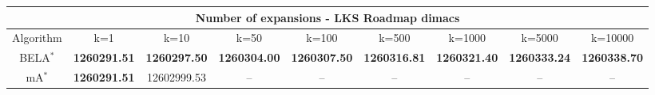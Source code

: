 \begin{tabular}{c|cccccccc}\toprule
\multicolumn{9}{c}{Number of expansions - LKS Roadmap dimacs}\\ \midrule
Algorithm & k=1 & k=10 & k=50 & k=100 & k=500 & k=1000 & k=5000 & k=10000 \\ \midrule
BELA$^*$ & \textbf{1260291.51} & \textbf{1260297.50} & \textbf{1260304.00} & \textbf{1260307.50} & \textbf{1260316.81} & \textbf{1260321.40} & \textbf{1260333.24} & \textbf{1260338.70} \\
mA$^*$ & \textbf{1260291.51} & 12602999.53 & -- & -- & -- & -- & -- & -- \\ \bottomrule 
\end{tabular}
